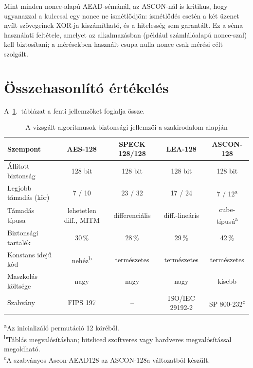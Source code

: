\documentclass[a4paper,12pt]{report}
\theoremstyle{definition}
\theoremstyle{remark}
\begin{document}
Mint minden nonce-alapú AEAD-sémánál, az ASCON-nál is kritikus, hogy ugyanazzal a kulccsal egy nonce ne ismétlődjön: ismétlődés esetén a két üzenet nyílt szövegeinek XOR-ja kiszámítható, és a hitelesség sem garantált. Ez a séma használati feltétele, amelyet az alkalmazásban (például számlálóalapú nonce-szal) kell biztosítani; a mérésekben használt csupa nulla nonce csak mérési célt szolgált.

\section{Összehasonlító értékelés}\label{sec:security_compare}

A~\ref{table:security_compare}.~táblázat a fenti jellemzőket foglalja össze.

\begin{table}[h!]
\centering
\caption{A vizsgált algoritmusok biztonsági jellemzői a szakirodalom alapján}
\label{table:security_compare}
\footnotesize
\vspace{.2 cm}
\setlength{\tabcolsep}{3.5pt}
\begin{tabular}{lcccc}
\hline
\textbf{Szempont} & \textbf{AES-128} & \textbf{SPECK 128/128} & \textbf{LEA-128} & \textbf{ASCON-128} \\
\hline
Állított biztonság & 128 bit & 128 bit & 128 bit & 128 bit \\
Legjobb támadás (kör) & 7 / 10 & 23 / 32 & 17 / 24 & 7 / 12\textsuperscript{a} \\
Támadás típusa & lehetetlen diff., MITM & differenciális & diff.-lineáris & cube-típusú\textsuperscript{a} \\
Biztonsági tartalék & 30\,\% & 28\,\% & 29\,\% & 42\,\% \\
Konstans idejű kód & nehéz\textsuperscript{b} & természetes & természetes & természetes \\
Maszkolás költsége & nagy & nagy & nagy & kisebb \\
Szabvány & FIPS 197 & -- & ISO/IEC 29192-2 & SP 800-232\textsuperscript{c} \\
\hline
\end{tabular}
\begin{flushleft}
\footnotesize
\textsuperscript{a}Az inicializáló permutáció 12 köréből.\\
\textsuperscript{b}Táblás megvalósításban; bitsliced szoftveres vagy hardveres megvalósítással megoldható.\\
\textsuperscript{c}A szabványos Ascon-AEAD128 az ASCON-128a változatból készült.
\end{flushleft}
\end{table}
\end{document}

